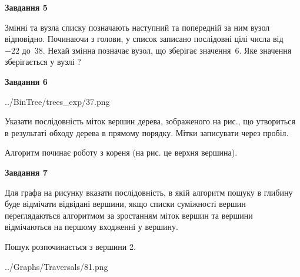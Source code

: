 \documentclass[12pt, ukrainian]{article}
\begin{document}
{\begin {large}
{\begin {center}\textbf{Завдання 5}\end {center}}\par
Змінні  та  вузла списку позначають наступний та попередній за ним вузол відповідно. Починаючи з голови, у список записано послідовні цілі числа від~$-22$ до~$38$. Нехай змінна  позначає вузол, що зберігає значення~$6$.
Яке значення зберігається у вузлі  ?\par
\newpage

{\begin {center}\textbf{Завдання 6}\end {center}}\par

\begin{center}
	{../BinTree/trees_exp/37.png}
\end{center}
Указати послідовність міток вершин дерева, зображеного на рис., що утвориться в результаті обходу дерева в прямому порядку. Мітки записувати через пробіл.\par Алгоритм починає роботу з кореня (на рис. це верхня вершина).\par
\newpage

{\begin {center}\textbf{Завдання 7}\end {center}}\par
Для графа на рисунку вказати послідовність, в якій алгоритм пошуку в глибину буде відмічати відвідані вершини, якщо списки суміжності вершин переглядаються алгоритмом за зростанням міток вершин та вершини відмічаються на першому вход\-женні у вершину.\par
Пошук розпочинається з вершини 2.\par

\begin{center}
	{../Graphs/Traversals/81.png}
\end{center}\par
\newpage


\end{large}}
\end{document}
